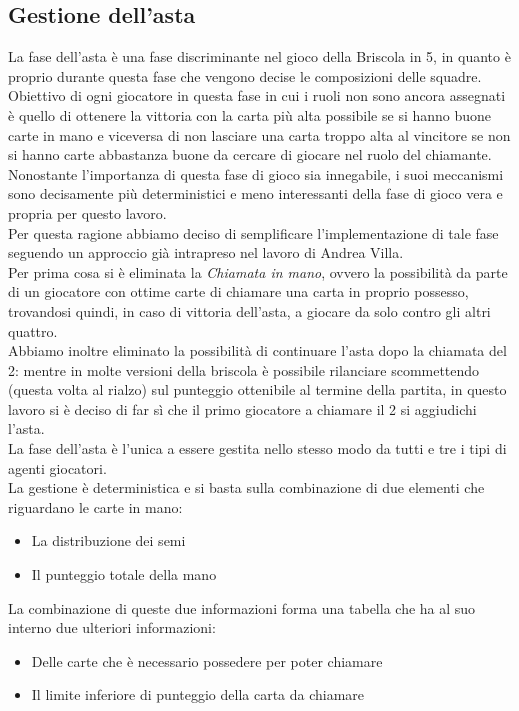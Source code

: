 \documentclass[runningheads,a4paper]{llncs}
\begin{document}
\subsection{Gestione dell'asta}
La fase dell'asta è una fase discriminante nel gioco della Briscola in 5, in quanto è proprio durante questa fase che vengono decise le composizioni delle squadre.\\
Obiettivo di ogni giocatore in questa fase in cui i ruoli non sono ancora assegnati è quello di ottenere la vittoria con la carta più alta possibile se si hanno buone carte in mano e viceversa di non lasciare una carta troppo alta al vincitore se non si hanno carte abbastanza buone da cercare di giocare nel ruolo del chiamante.\\
Nonostante l'importanza di questa fase di gioco sia innegabile, i suoi meccanismi sono decisamente più deterministici e meno interessanti della fase di gioco vera e propria per questo lavoro.\\
Per questa ragione abbiamo deciso di semplificare l'implementazione di tale fase seguendo un approccio già intrapreso nel lavoro di Andrea Villa.\\
Per prima cosa si è eliminata la \emph{Chiamata in mano}, ovvero la possibilità da parte di un giocatore con ottime carte di chiamare una carta in proprio possesso, trovandosi quindi, in caso di vittoria dell'asta, a giocare da solo contro gli altri quattro.\\
Abbiamo inoltre eliminato la possibilità di continuare l'asta dopo la chiamata del 2: mentre in molte versioni della briscola è possibile rilanciare scommettendo (questa volta al rialzo) sul punteggio ottenibile al termine della partita, in questo lavoro si è deciso di far sì che il primo giocatore a chiamare il 2 si aggiudichi l'asta.\\
La fase dell'asta è l'unica a essere gestita nello stesso modo da tutti e tre i tipi di agenti giocatori.\\
La gestione è deterministica e si basta sulla combinazione di due elementi che riguardano le carte in mano:
\begin{itemize}
   \item La distribuzione dei semi
   \item Il punteggio totale della mano
\end{itemize}
La combinazione di queste due informazioni forma una tabella che ha al suo interno due ulteriori informazioni:
\begin{itemize}
   \item Delle carte che è necessario possedere per poter chiamare
   \item Il limite inferiore di punteggio della carta da chiamare 
\end{itemize}
\end{document}
